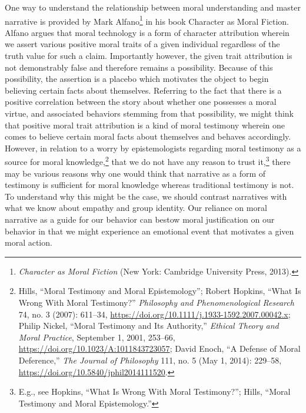 \documentclass[phdthesis,12pt,final,a4paper]{wuthesis}
\theoremstyle{definition}
\theoremstyle{definition}
\theoremstyle{definition}
\theoremstyle{definition}
\theoremstyle{remark}
\begin{document}
One way to understand the relationship between moral understanding and master narrative is provided by Mark Alfano\footnote{\emph{Character as Moral Fiction} (New York: Cambridge University Press, 2013).} in his book Character as Moral Fiction. Alfano argues that moral technology is a form of character attribution wherein we assert various positive moral traits of a given individual regardless of the truth value for such a claim. Importantly however, the given trait attribution is not demonstrably false and therefore remains a possibility. Because of this possibility, the assertion is a placebo which motivates the object to begin believing certain facts about themselves. Referring to the fact that there is a positive correlation between the story about whether one possesses a moral virtue, and associated behaviors stemming from that possibility, we might think that positive moral trait attribution is a kind of moral testimony wherein one comes to believe certain moral facts about themselves and behaves accordingly. However, in relation to a worry by epistemologists regarding moral testimony as a source for moral knowledge,\footnote{Hills, {``Moral Testimony and Moral Epistemology''}; Robert Hopkins, {``What {Is Wrong With Moral Testimony}?''} \emph{Philosophy and Phenomenological Research} 74, no. 3 (2007): 611--34, \url{https://doi.org/10.1111/j.1933-1592.2007.00042.x}; Philip Nickel, {``Moral {Testimony} and Its {Authority},''} \emph{Ethical Theory and Moral Practice}, September 1, 2001, 253--66, \url{https://doi.org/10.1023/A:1011843723057}; David Enoch, {``A {Defense} of {Moral Deference},''} \emph{The Journal of Philosophy} 111, no. 5 (May 1, 2014): 229--58, \url{https://doi.org/10.5840/jphil2014111520}.} that we do not have any reason to trust it,\footnote{E.g., see Hopkins, {``What {Is Wrong With Moral Testimony}?''}; Hills, {``Moral Testimony and Moral Epistemology.''}} there may be various reasons why one would think that narrative as a form of testimony is sufficient for moral knowledge whereas traditional testimony is not. To understand why this might be the case, we should contrast narratives with what we know about empathy and group identity. Our reliance on moral narrative as a guide for our behavior can bestow moral justification on our behavior in that we might experience an emotional event that motivates a given moral action.
\end{document}
